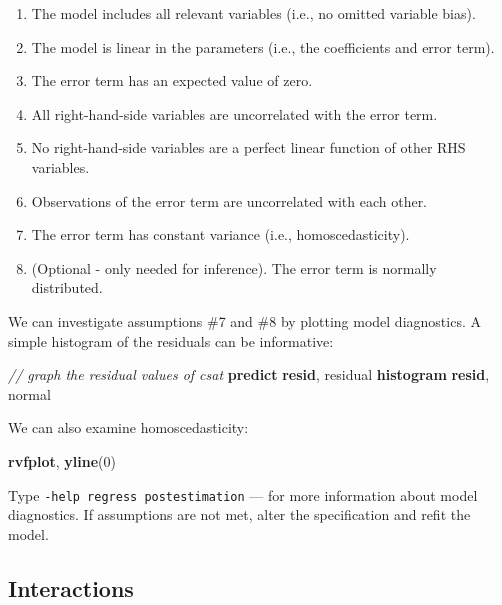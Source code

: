 \documentclass[
]{book}
\newenvironment{Shaded}{\begin{snugshade}}{\end{snugshade}}
\newcommand{\CommentTok}[1]{\textcolor[rgb]{0.56,0.35,0.01}{\textit{#1}}}
\newcommand{\FunctionTok}[1]{\textcolor[rgb]{0.00,0.00,0.00}{#1}}
\newcommand{\KeywordTok}[1]{\textcolor[rgb]{0.13,0.29,0.53}{\textbf{#1}}}
\newcommand{\NormalTok}[1]{#1}
\providecommand{\tightlist}{%
  \setlength{\itemsep}{0pt}\setlength{\parskip}{0pt}}
\begin{document}
\begin{enumerate}
\def\labelenumi{\arabic{enumi}.}
\tightlist
\item
  The model includes all relevant variables (i.e., no omitted variable bias).
\item
  The model is linear in the parameters (i.e., the coefficients and error term).
\item
  The error term has an expected value of zero.
\item
  All right-hand-side variables are uncorrelated with the error term.
\item
  No right-hand-side variables are a perfect linear function of other RHS variables.
\item
  Observations of the error term are uncorrelated with each other.
\item
  The error term has constant variance (i.e., homoscedasticity).
\item
  (Optional - only needed for inference). The error term is normally distributed.
\end{enumerate}

We can investigate assumptions \#7 and \#8 by plotting model diagnostics. A simple histogram of the residuals can be informative:

\begin{Shaded}
\begin{Highlighting}[]
\CommentTok{// graph the residual values of csat}
\KeywordTok{predict} \KeywordTok{resid}\NormalTok{, residual}
\KeywordTok{histogram} \KeywordTok{resid}\NormalTok{, }\FunctionTok{normal} 
\end{Highlighting}
\end{Shaded}

We can also examine homoscedasticity:

\begin{Shaded}
\begin{Highlighting}[]
\KeywordTok{rvfplot}\NormalTok{, }\KeywordTok{yline}\NormalTok{(0)}
\end{Highlighting}
\end{Shaded}

Type \texttt{-help\ regress\ postestimation} --- for more information about model diagnostics. If assumptions are not met, alter the specification and refit the model.

\hypertarget{interactions}{%
\subsection{Interactions}\label{interactions}}
\end{document}
